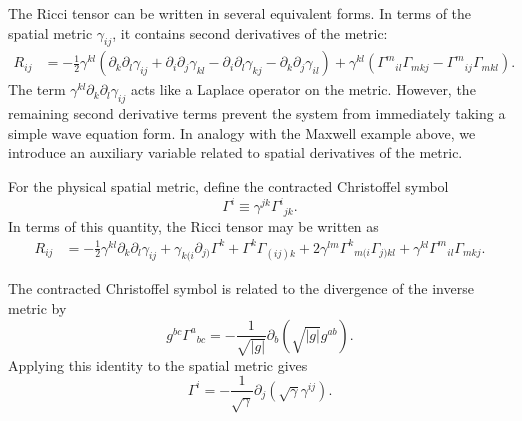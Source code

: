 The Ricci tensor can be written in several equivalent forms. In terms of the spatial metric $\gamma_{ij}$, it contains second derivatives of the metric:  
\begin{equation}
\begin{aligned}
R_{ij}
&=
-\frac{1}{2}\gamma^{kl}
\left(
\partial_k\partial_l\gamma_{ij}
+
\partial_i\partial_j\gamma_{kl}
-
\partial_i\partial_l\gamma_{kj}
-
\partial_k\partial_j\gamma_{il}
\right)
+
\gamma^{kl}
\left(
\Gamma^{m}{}_{il}\Gamma_{mkj}
-
\Gamma^{m}{}_{ij}\Gamma_{mkl}
\right).
\end{aligned}
\end{equation}
The term $\gamma^{kl}\partial_k\partial_l\gamma_{ij}$ acts like a Laplace operator on the metric. However, the remaining second derivative terms prevent the system from immediately taking a simple wave equation form. In analogy with the Maxwell example above, we introduce an auxiliary variable related to spatial derivatives of the metric.

For the physical spatial metric, define the contracted Christoffel symbol
\begin{equation}
\Gamma^i
\equiv
\gamma^{jk}\Gamma^i{}_{jk}.
\end{equation}
In terms of this quantity, the Ricci tensor may be written as  
\begin{equation}
\begin{aligned}
R_{ij}
&=
-\frac{1}{2}\gamma^{kl}\partial_k\partial_l\gamma_{ij}
+
\gamma_{k(i}\partial_{j)}\Gamma^k
+
\Gamma^k\Gamma_{(ij)k}
+
2\gamma^{lm}\Gamma^k{}_{m(i}\Gamma_{j)kl}
+
\gamma^{kl}\Gamma^m{}_{il}\Gamma_{mkj}.
\end{aligned}
\end{equation}

The contracted Christoffel symbol is related to the divergence of the inverse metric by
\begin{equation}
g^{bc}\Gamma^a{}_{bc}
=
-\frac{1}{\sqrt{|g|}}
\partial_b
\left(
\sqrt{|g|}g^{ab}
\right).
\end{equation}
Applying this identity to the spatial metric gives
\begin{equation}
\label{eq:Gamma_eq}
\Gamma^i
=
-\frac{1}{\sqrt{\gamma}}
\partial_j
\left(
\sqrt{\gamma}\gamma^{ij}
\right).
\end{equation}


